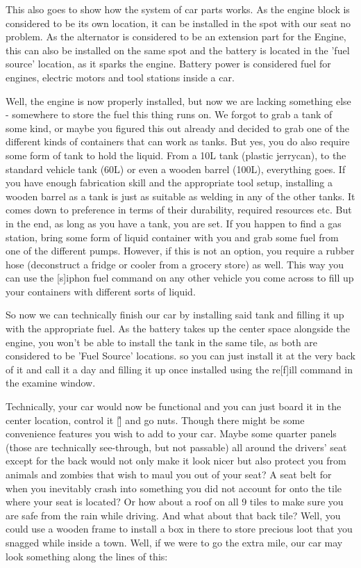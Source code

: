 This also goes to show how the system of car parts works. As the engine block is considered to be its own location, it can be installed in the spot with our seat no problem. As the alternator is considered to be an extension part for the Engine, this can also be installed on the same spot and the battery is located in the 'fuel source' location, as it sparks the engine. Battery power is considered fuel for engines, electric motors and tool stations inside a car.

Well, the engine is now properly installed, but now we are lacking something else - somewhere to store the fuel this thing runs on. We forgot to grab a tank of some kind, or maybe you figured this out already and decided to grab one of the different kinds of containers that can work as tanks. But yes, you do also require some form of tank to hold the liquid. From a 10L tank (plastic jerrycan), to the standard vehicle tank (60L) or even a wooden barrel (100L), everything goes. If you have enough fabrication skill and the appropriate tool setup, installing a wooden barrel as a tank is just as suitable as welding in any of the other tanks. It comes down to preference in terms of their durability, required resources etc. But in the end, as long as you have a tank, you are set. If you happen to find a gas station, bring some form of liquid container with you and grab some fuel from one of the different pumps. However, if this is not an option, you require a rubber hose (deconstruct a fridge or cooler from a grocery store) as well. This way you can use the [s]iphon fuel command on any other vehicle you come across to fill up your containers with different sorts of liquid.

So now we can technically finish our car by installing said tank and filling it up with the appropriate fuel. As the battery takes up the center space alongside the engine, you won't be able to install the tank in the same tile, as both are considered to be 'Fuel Source' locations. so you can just install it at the very back of it and call it a day and filling it up once installed using the re[f]ill command in the examine window.

Technically, your car would now be functional and you can just board it in the center location, control it [\^] and go nuts. Though there might be some convenience features you wish to add to your car. Maybe some quarter panels (those are technically see-through, but not passable) all around the drivers' seat except for the back would not only make it look nicer but also protect you from animals and zombies that wish to maul you out of your seat? A seat belt for when you inevitably crash into something you did not account for onto the tile where your seat is located? Or how about a roof on all 9 tiles to make sure you are safe from the rain while driving. And what about that back tile? Well, you could use a wooden frame to install a box in there to store precious loot that you snagged while inside a town.
Well, if we were to go the extra mile, our car may look something along the lines of this:

